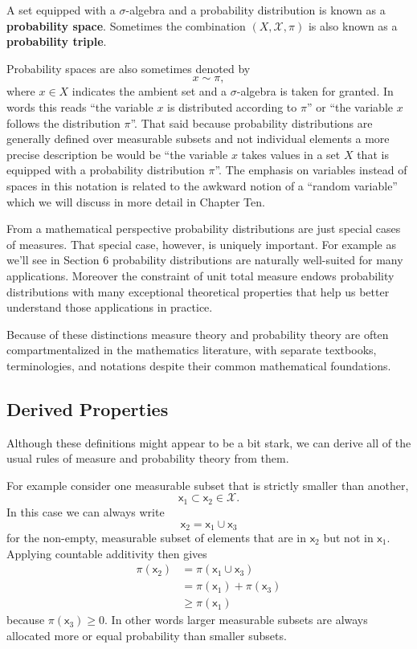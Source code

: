 \documentclass[
  letterpaper,
  DIV=11,
  numbers=noendperiod]{scrartcl}
\begin{document}
A set equipped with a \(\sigma\)-algebra and a probability distribution
is known as a \textbf{probability space}. Sometimes the combination
\((X, \mathcal{X}, \pi)\) is also known as a \textbf{probability
triple}.

Probability spaces are also sometimes denoted by \[
x \sim \pi,
\] where \(x \in X\) indicates the ambient set and a \(\sigma\)-algebra
is taken for granted. In words this reads ``the variable \(x\) is
distributed according to \(\pi\)'' or ``the variable \(x\) follows the
distribution \(\pi\)''. That said because probability distributions are
generally defined over measurable subsets and not individual elements a
more precise description be would be ``the variable \(x\) takes values
in a set \(X\) that is equipped with a probability distribution
\(\pi\)''. The emphasis on variables instead of spaces in this notation
is related to the awkward notion of a ``random variable'' which we will
discuss in more detail in Chapter Ten.

From a mathematical perspective probability distributions are just
special cases of measures. That special case, however, is uniquely
important. For example as we'll see in
\protect\hypertarget{sec:interpretations}{}{Section 6} probability
distributions are naturally well-suited for many applications. Moreover
the constraint of unit total measure endows probability distributions
with many exceptional theoretical properties that help us better
understand those applications in practice.

Because of these distinctions measure theory and probability theory are
often compartmentalized in the mathematics literature, with separate
textbooks, terminologies, and notations despite their common
mathematical foundations.

\hypertarget{derived-properties}{%
\subsection{Derived Properties}\label{derived-properties}}

Although these definitions might appear to be a bit stark, we can derive
all of the usual rules of measure and probability theory from them.

For example consider one measurable subset that is strictly smaller than
another, \[
\mathsf{x}_{1} \subset \mathsf{x}_{2} \in \mathcal{X}.
\] In this case we can always write \[
\mathsf{x}_{2} = \mathsf{x}_{1} \cup \mathsf{x}_{3}
\] for the non-empty, measurable subset of elements that are in
\(\mathsf{x}_{2}\) but not in \(\mathsf{x}_{1}\). Applying countable
additivity then gives \begin{align*}
\pi(\mathsf{x}_{2})
&= \pi(\mathsf{x}_{1} \cup \mathsf{x}_{3})
\\
&= \pi(\mathsf{x}_{1}) + \pi(\mathsf{x}_{3})
\\
&\ge \pi(\mathsf{x}_{1})
\end{align*} because \(\pi(\mathsf{x}_{3}) \ge 0\). In other words
larger measurable subsets are always allocated more or equal probability
than smaller subsets.
\end{document}
